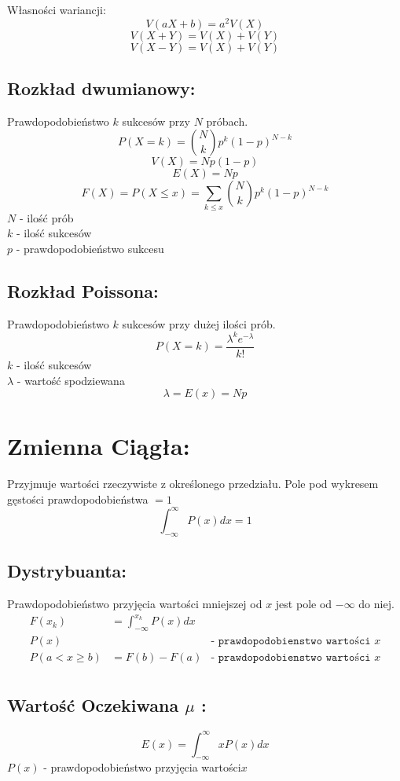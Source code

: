 \documentclass[fleqn]{article}
\begin{document}
Własności wariancji:
\[V(aX+b)=a^2V(X)\]
\[V(X+Y)=V(X)+V(Y)\]
\[V(X-Y)=V(X)+V(Y)\]

\subsection{Rozkład dwumianowy:}
Prawdopodobieństwo $k$ sukcesów przy $N$ próbach.
\[P(X=k) = \binom{N}{k}p^k(1-p)^{N-k}\]
\[V(X)= Np(1-p)\]
\[E(X)=Np\]
\[F(X)=P(X \leq x) = \sum_{k \leq x}{\binom{N}{k}p^k(1-p)^{N-k}}\]
$N$ - ilość prób\\
$k$ - ilość sukcesów\\
$p$ - prawdopodobieństwo sukcesu

\subsection{Rozkład Poissona:}
Prawdopodobieństwo $k$ sukcesów przy dużej ilości prób.
\[P(X=k) = \frac{\lambda^ke^{-\lambda}}{k!}\]
$k$ - ilość sukcesów\\
$\lambda$ - wartość spodziewana
\[\lambda = E(x) = Np\]

\pagebreak
\section{Zmienna Ciągła:}
Przyjmuje wartości rzeczywiste z określonego przedziału.
Pole pod wykresem gęstości prawdopodobieństwa \(=1\)
\[\int_{-\infty}^{\infty}{P(x)dx}=1\]

\subsection{Dystrybuanta:}
Prawdopodobieństwo przyjęcia wartości mniejszej od $x$ jest pole od $-\infty$ do niej.
\begin{align*}
F(x_k)& = \int_{-\infty}^{x_k}{P(x)dx}\\
P(x) & & \texttt{- prawdopodobienstwo wartości }x\\
P(a < x \geq b)&= F(b)-F(a) &\texttt{- prawdopodobienstwo wartości }x\\
\end{align*}

\subsection{Wartość Oczekiwana \texorpdfstring{\(\mu\)}{E(X)} :}
\[E(x) = \int_{-\infty}^{\infty}{xP(x)dx}\]
$P(x)$ - prawdopodobieństwo przyjęcia wartości$x$
\end{document}
